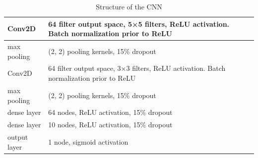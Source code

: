 \documentclass[12pt]{article}
\numberwithin{figure}{section} %
\begin{document}
\begin{table}[H]
	\begin{center}
		\begin{tabular}{ | m{2cm} | m{8cm} | } 
			\hline
			Conv2D & 64 filter output space, 5×5 filters, ReLU activation. Batch normalization prior to ReLU \\ 
			\hline
			max pooling & (2, 2) pooling kernels, 15\% dropout  \\ 
			\hline
			Conv2D & 64 filter output space, 3×3 filters, ReLU activation. Batch normalization prior to ReLU  \\ 
			\hline
			max pooling & (2, 2) pooling kernels, 15\% dropout \\ 
			\hline
			dense layer & 64 nodes, ReLU activation, 15\% dropout  \\ 
			\hline
			dense layer & 10 nodes, ReLU activation, 15\% dropout  \\ 
			\hline
			output layer & 1 node, sigmoid activation \\
			\hline
		\end{tabular}
	\caption{Structure of the CNN}
	\label{table:CNN structure}
	\vspace{-1.5em}
	\end{center}
\end{table}
\end{document}
